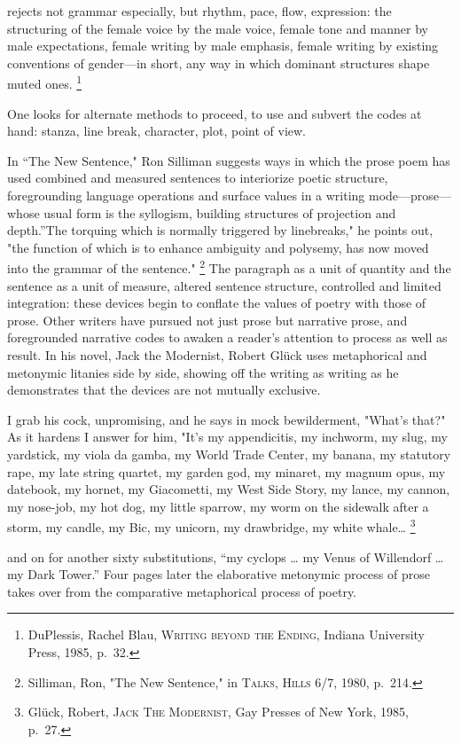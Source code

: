 \documentclass[
]{memoir}
\begin{document}
rejects not grammar especially, but rhythm, pace, flow, expression: the
structuring of the female voice by the male voice, female tone and
manner by male expectations, female writing by male emphasis, female
writing by existing conventions of gender---in short, any way in which
dominant structures shape muted ones. \footnote{DuPlessis, Rachel Blau,
  \textsc{Writing beyond the Ending}, Indiana University Press, 1985,
  p.~32.}

One looks for alternate methods to proceed, to use and subvert the codes
at hand: stanza, line break, character, plot, point of view.

In ``The New Sentence," Ron Silliman suggests ways in which the prose
poem has used combined and measured sentences to interiorize poetic
structure, foregrounding language operations and surface values in a
writing mode---prose---whose usual form is the syllogism, building
structures of projection and depth.''The torquing which is normally
triggered by linebreaks," he points out, "the function of which is to
enhance ambiguity and polysemy, has now moved into the grammar of the
sentence." \footnote{Silliman, Ron, "The New Sentence," in
  \textsc{Talks, Hills} 6/7, 1980, p.~214.} The paragraph as a unit of
quantity and the sentence as a unit of measure, altered sentence
structure, controlled and limited integration: these devices begin to
conflate the values of poetry with those of prose. Other writers have
pursued not just prose but narrative prose, and foregrounded narrative
codes to awaken a reader's attention to process as well as result. In
his novel, Jack the Modernist, Robert Glück uses metaphorical and
metonymic litanies side by side, showing off the writing as writing as
he demonstrates that the devices are not mutually exclusive.

I grab his cock, unpromising, and he says in mock bewilderment, "What's
that?" As it hardens I answer for him, "It's my appendicitis, my
inchworm, my slug, my yardstick, my viola da gamba, my World Trade
Center, my banana, my statutory rape, my late string quartet, my garden
god, my minaret, my magnum opus, my datebook, my hornet, my Giacometti,
my West Side Story, my lance, my cannon, my nose-job, my hot dog, my
little sparrow, my worm on the sidewalk after a storm, my candle, my
Bic, my unicorn, my drawbridge, my white whale\ldots{} \footnote{Glück,
  Robert, \textsc{Jack The Modernist}, Gay Presses of New York, 1985,
  p.~27.}

and on for another sixty substitutions, ``my cyclops \ldots{} my Venus
of Willendorf \ldots{} my Dark Tower.'' Four pages later the elaborative
metonymic process of prose takes over from the comparative metaphorical
process of poetry.
\end{document}
